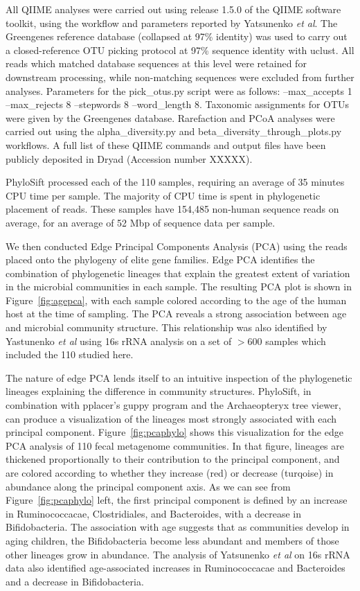 \documentclass[10pt]{article}
\begin{document}
All QIIME analyses were carried out using release 1.5.0 of the QIIME software toolkit, using the workflow and parameters reported by Yatsunenko \textit{et al}. The Greengenes reference database (collapsed at 97\% identity) was used to carry out a closed-reference OTU picking protocol at 97\% sequence identity with uclust. All reads which matched database sequences at this level were retained for downstream processing, while non-matching sequences were excluded from further analyses. Parameters for the pick\_otus.py script were as follows: --max\_accepts 1 --max\_rejects 8 --stepwords 8 --word\_length 8. Taxonomic assignments for OTUs were given by the Greengenes database. Rarefaction and PCoA analyses were carried out using the alpha\_diversity.py and beta\_diversity\_through\_plots.py workflows. A full list of these QIIME commands and output files have been publicly deposited in Dryad (Accession number XXXXX).

PhyloSift processed each of the 110 samples, requiring an average of 35 minutes CPU time per sample.
The majority of CPU time is spent in phylogenetic placement of reads.
These samples have 154,485 non-human sequence reads on average, for an average of 52 Mbp of sequence data per sample.

We then conducted Edge Principal Components Analysis (PCA) using the reads placed onto the phylogeny of elite gene families.
Edge PCA identifies the combination of phylogenetic lineages that explain the greatest extent of variation in the microbial communities in each sample.
The resulting PCA plot is shown in Figure~\ref{fig:agepca}, with each sample colored according to the age of the human host at the time of sampling.
The PCA reveals a strong association between age and microbial community structure.
This relationship was also identified by Yastunenko \textit{et al} using 16s rRNA analysis on a set of $>$600 samples which included the 110 studied here.

The nature of edge PCA lends itself to an intuitive inspection of the phylogenetic lineages explaining the difference in community structures.
PhyloSift, in combination with pplacer's guppy program and the Archaeopteryx tree viewer, can produce a visualization of the lineages most strongly associated with each principal component.
Figure~\ref{fig:pcaphylo} shows this visualization for the edge PCA analysis of 110 fecal metagenome communities.
In that figure, lineages are thickened proportionally to their contribution to the principal component, and are colored according to whether they increase (red) or decrease (turqoise) in abundance along the principal component axis.
As we can see from Figure~\ref{fig:pcaphylo} left, the first principal component is defined by an increase in Ruminococcacae, Clostridiales, and Bacteroides, with a decrease in Bifidobacteria. 
The association with age suggests that as communities develop in aging children, the Bifidobacteria become less abundant and members of those other lineages grow in abundance.
The analysis of Yatsunenko \textit{et al} on 16s rRNA data also identified age-associated increases in Ruminococcacae and Bacteroides and a decrease in Bifidobacteria.
\end{document}
